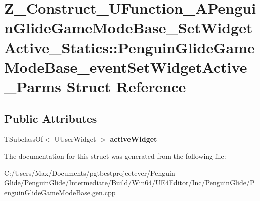 \hypertarget{struct_z___construct___u_function___a_penguin_glide_game_mode_base___set_widget_active___staticsd10a2cb5d52cd0519a2ff107a8270c0c}{}\section{Z\+\_\+\+Construct\+\_\+\+U\+Function\+\_\+\+A\+Penguin\+Glide\+Game\+Mode\+Base\+\_\+\+Set\+Widget\+Active\+\_\+\+Statics\+::Penguin\+Glide\+Game\+Mode\+Base\+\_\+event\+Set\+Widget\+Active\+\_\+\+Parms Struct Reference}
\label{struct_z___construct___u_function___a_penguin_glide_game_mode_base___set_widget_active___staticsd10a2cb5d52cd0519a2ff107a8270c0c}
\subsection*{Public Attributes}
\begin{DoxyCompactItemize}
\item 
\mbox{\label{struct_z___construct___u_function___a_penguin_glide_game_mode_base___set_widget_active___staticsd10a2cb5d52cd0519a2ff107a8270c0c_a4ebcc46f42251ea4d0b3c74da018aac8}} 
T\+Subclass\+Of$<$ U\+User\+Widget $>$ {\bfseries active\+Widget}
\end{DoxyCompactItemize}


The documentation for this struct was generated from the following file\+:\begin{DoxyCompactItemize}
\item 
C\+:/\+Users/\+Max/\+Documents/pgtbestprojectever/\+Penguin Glide/\+Penguin\+Glide/\+Intermediate/\+Build/\+Win64/\+U\+E4\+Editor/\+Inc/\+Penguin\+Glide/Penguin\+Glide\+Game\+Mode\+Base.\+gen.\+cpp\end{DoxyCompactItemize}
